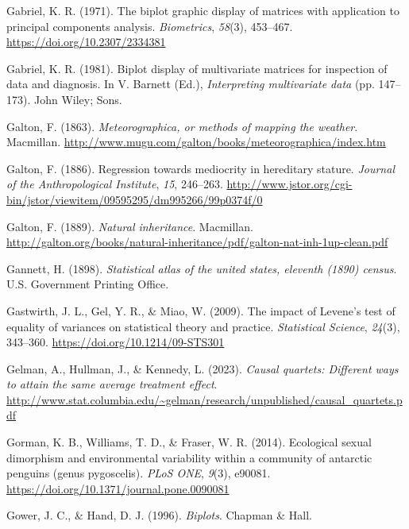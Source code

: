 \documentclass[
  letterpaper,
  10pt,
  krantz2]{krantz}
\newlength{\cslhangindent}
\newenvironment{CSLReferences}[2] %
 {\begin{list}{}{%
  \setlength{\itemindent}{0pt}
  \setlength{\leftmargin}{0pt}
  \setlength{\parsep}{0pt}
  \ifodd #1
   \setlength{\leftmargin}{\cslhangindent}
   \setlength{\itemindent}{-1\cslhangindent}
  \fi
  \setlength{\itemsep}{#2\baselineskip}}}
 {\end{list}}
\begin{document}
{\begin{CSLReferences}{1}{0}
Gabriel, K. R. (1971). The biplot graphic display of matrices with
application to principal components analysis. \emph{Biometrics},
\emph{58}(3), 453--467. \url{https://doi.org/10.2307/2334381}

Gabriel, K. R. (1981). Biplot display of multivariate matrices for
inspection of data and diagnosis. In V. Barnett (Ed.),
\emph{Interpreting multivariate data} (pp. 147--173). John Wiley; Sons.

Galton, F. (1863). \emph{Meteorographica, or methods of mapping the
weather}. Macmillan.
\url{http://www.mugu.com/galton/books/meteorographica/index.htm}

Galton, F. (1886). Regression towards mediocrity in hereditary stature.
\emph{Journal of the Anthropological Institute}, \emph{15}, 246--263.
\url{http://www.jstor.org/cgi-bin/jstor/viewitem/09595295/dm995266/99p0374f/0}

Galton, F. (1889). \emph{Natural inheritance}. Macmillan.
\url{http://galton.org/books/natural-inheritance/pdf/galton-nat-inh-1up-clean.pdf}

Gannett, H. (1898). \emph{Statistical atlas of the united states,
eleventh (1890) census}. U.S. Government Printing Office.

Gastwirth, J. L., Gel, Y. R., \& Miao, W. (2009). The impact of
{Levene's} test of equality of variances on statistical theory and
practice. \emph{Statistical Science}, \emph{24}(3), 343--360.
\url{https://doi.org/10.1214/09-STS301}

Gelman, A., Hullman, J., \& Kennedy, L. (2023). \emph{Causal quartets:
Different ways to attain the same average treatment effect}.
\url{http://www.stat.columbia.edu/~gelman/research/unpublished/causal_quartets.pdf}

Gorman, K. B., Williams, T. D., \& Fraser, W. R. (2014). Ecological
sexual dimorphism and environmental variability within a community of
antarctic penguins (genus pygoscelis). \emph{{PLoS} {ONE}}, \emph{9}(3),
e90081. \url{https://doi.org/10.1371/journal.pone.0090081}

Gower, J. C., \& Hand, D. J. (1996). \emph{Biplots}. Chapman \& Hall.


\end{CSLReferences}}
\end{document}

